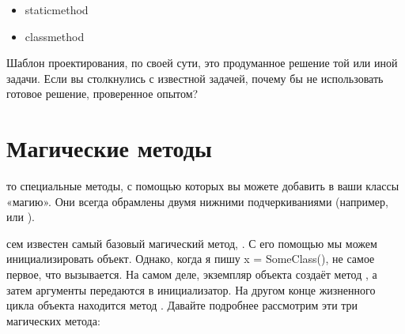 \begin{itemize}
\item staticmethod
\item classmethod
\end{itemize}

Шаблон проектирования, по своей сути, это продуманное решение той или иной задачи. Если вы столкнулись с известной задачей, почему бы не использовать готовое решение, проверенное опытом?

\section{Магические методы}	

то специальные методы, с помощью которых вы можете добавить в ваши классы «магию». Они всегда обрамлены двумя нижними подчеркиваниями (например,  или ). 

сем известен самый базовый магический метод, . С его помощью мы можем инициализировать объект. Однако, когда я пишу x = SomeClass(),  не самое первое, что вызывается. На самом деле, экземпляр объекта создаёт метод , а затем аргументы передаются в инициализатор. На другом конце жизненного цикла объекта находится метод . Давайте подробнее рассмотрим эти три магических метода:

